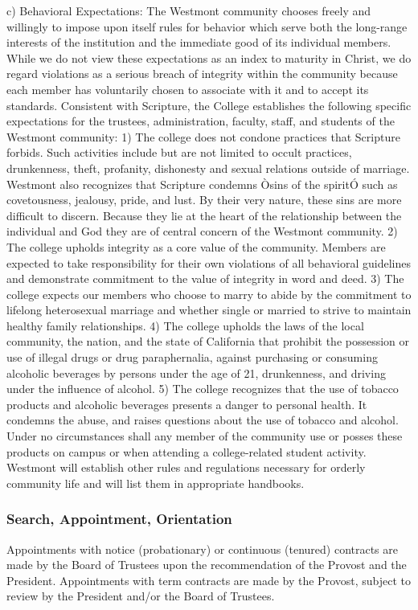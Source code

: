 \documentclass[letterpaper, 11pt]{article}
\begin{document}
				c) Behavioral Expectations:
				The Westmont community chooses freely and willingly to impose upon itself rules for behavior which serve both the long-range interests of the institution and the immediate good of its individual members.  While we do not view these expectations as an index to maturity in Christ, we do regard violations as a serious breach of integrity within the community because each member has voluntarily chosen to associate with it and to accept its standards.
				Consistent with Scripture, the College establishes the following specific expectations for the trustees, administration, faculty, staff, and students of the Westmont community:
				1) The college does not condone practices that Scripture forbids.  Such activities include but are not limited to occult practices, drunkenness, theft, profanity, dishonesty and sexual relations outside of marriage.  Westmont also recognizes that Scripture condemns Òsins of the spiritÓ such as covetousness, jealousy, pride, and lust.  By their very nature, these sins are more difficult to discern.  Because they lie at the heart of the relationship between the individual and God they are of central concern of the Westmont community.
				2) The college upholds integrity as a core value of the community.  Members are expected to take responsibility for their own violations of all behavioral guidelines and demonstrate commitment to the value of integrity in word and deed.
				3) The college expects our members who choose to marry to abide by the commitment to lifelong heterosexual marriage and whether single or married to strive to maintain healthy family relationships.
				4) The college upholds the laws of the local community, the nation, and the state of California that prohibit the possession or use of illegal drugs or drug paraphernalia, against purchasing or consuming alcoholic beverages by persons under the age of 21, drunkenness, and driving under the influence of alcohol.
				5) The college recognizes that the use of tobacco products and alcoholic beverages presents a danger to personal health.  It condemns the abuse, and raises questions about the use of tobacco and alcohol.  Under no circumstances shall any member of the community use or posses these products on campus or when attending a college-related student activity.
				Westmont will establish other rules and regulations necessary for orderly community life and will list them in appropriate handbooks.
		\subsubsection{Search, Appointment, Orientation}
			Appointments with notice (probationary) or continuous (tenured) contracts are made by the Board of Trustees upon the recommendation of the Provost and the President. Appointments with term contracts are made by the Provost, subject to review by the President and/or the Board of Trustees.
\end{document}
